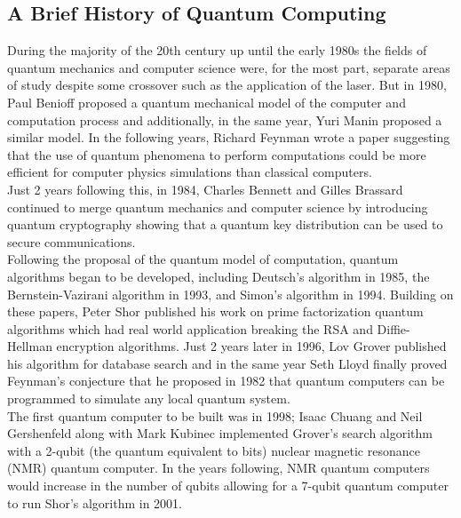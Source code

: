 \documentclass{amsart}
\numberwithin{equation}{section}
\begin{document}
\subsection{A Brief History of Quantum Computing}
\begin{justify}
During the majority of the 20th century up until the early 1980s the fields of quantum mechanics and computer science were, for the most part, separate areas of study despite some crossover such as the application of the laser. But in 1980, Paul Benioff proposed a quantum mechanical model of the computer and computation process \cite{Benioff1980} and additionally, in the same year, Yuri Manin proposed a similar model. \cite{Manin1980} In the following years, Richard Feynman wrote a paper suggesting that the use of quantum phenomena to perform computations could be more efficient for computer physics simulations than classical computers. \cite{Feynman1982} \\
Just 2 years following this, in 1984, Charles Bennett and Gilles Brassard continued to merge quantum mechanics and computer science by introducing quantum cryptography \cite{BennettBrassard1984} showing that a quantum key distribution can be used to secure communications. \\

Following the proposal of the quantum model of computation, quantum algorithms began to be developed, including Deutsch's algorithm in 1985, \cite{Deutsch1985} the Bernstein-Vazirani algorithm in 1993, \cite{BernsteinVazirani1993} and Simon's algorithm in 1994. \cite{Simon1994} Building on these papers, Peter Shor published his work on prime factorization quantum algorithms which had real world application breaking the RSA and Diffie-Hellman encryption algorithms. \cite{Shor1994} Just 2 years later in 1996, Lov Grover published his algorithm for database search \cite{Grover1996} and in the same year Seth Lloyd finally proved Feynman's conjecture that he proposed in 1982 that quantum computers can be programmed to simulate any local quantum system. \cite{Lloyd1996} \\

The first quantum computer to be built was in 1998; Isaac Chuang and Neil Gershenfeld along with Mark Kubinec implemented Grover's search algorithm with a 2-qubit (the quantum equivalent to bits) nuclear magnetic resonance (NMR) quantum computer. \cite{ChuangGershefeldKubinec1998} In the years following, NMR quantum computers would increase in the number of qubits allowing for a 7-qubit quantum computer to run Shor's algorithm in 2001. \cite{Vandersypen2001} \\


\end{justify}
\end{document}

